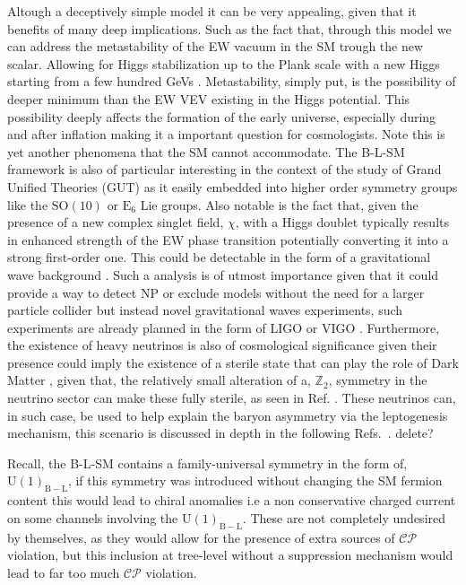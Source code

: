 \documentclass[10pt]{book}
\renewcommand{\(}{\left(}
\renewcommand{\)}{\right)}
\renewcommand{\[}{\left[}
\renewcommand{\]}{\right]}
\begin{document}
{ \color{gray} Altough a deceptively simple model it can be very appealing, given that it benefits of many deep implications. Such as the fact that, through this model we can address the metastability of the EW vacuum in the SM trough the new scalar. Allowing for Higgs stabilization up to the Plank scale with a new Higgs starting from a few hundred GeVs \cite{Degrassi:2012ry}. Metastability, simply put, is the possibility of deeper minimum than the EW VEV existing in the Higgs potential. This possibility deeply affects the formation of the early universe, especially during and after inflation making it a important question for cosmologists. Note this is yet another phenomena that the SM cannot accommodate. The B-L-SM framework is also of particular interesting in the context of the study of Grand Unified Theories (GUT) as it easily embedded into higher order symmetry groups like the $\mathrm{SO(10)}$ \cite{Chanowitz:1977ye} or $\mathrm{E}_6$ \cite{Achiman:1978vg} Lie groups. Also notable is the fact that, given the presence of a new complex singlet field, $\chi$, with a Higgs doublet typically results in enhanced strength of the EW phase transition potentially converting it into a strong first-order one. This could be detectable in the form of a gravitational wave background \cite{Barger:2008jx}. Such a analysis is of utmost importance given that it could provide a way to detect NP or exclude models without the need for a larger particle collider but instead novel gravitational waves experiments, such experiments are already planned in the form of LIGO or VIGO \cite{Abbott2020}. Furthermore, the existence of heavy neutrinos is also of cosmological significance given their presence could imply the existence of a sterile state that can play the role of Dark Matter \cite{Kaneta:2016vkq}, given that, the relatively small alteration of a, $\mathbb{Z}_2$, symmetry in the neutrino sector can make these fully sterile, as seen in Ref. \cite{Okada:2018ktp}. These neutrinos can, in such case, be used to help explain the baryon asymmetry via the leptogenesis mechanism, this scenario is discussed in depth in the following Refs.~\cite{Fukugita:1986hr}.} {\color{red} delete?} 

Recall, the B-L-SM contains a family-universal symmetry in the form of, $\mathrm{U(1)_{B-L}}$, if this symmetry was introduced without changing the SM fermion content this would lead to chiral anomalies i.e a non conservative charged current on some channels involving the $\mathrm{U(1)_{B-L}}$. These are not completely undesired by themselves, as they would allow for the presence of extra sources of $\mathcal{CP}$ violation, but this inclusion at tree-level without a suppression mechanism would lead to far too much $\mathcal{CP}$ violation. 
\end{document}

